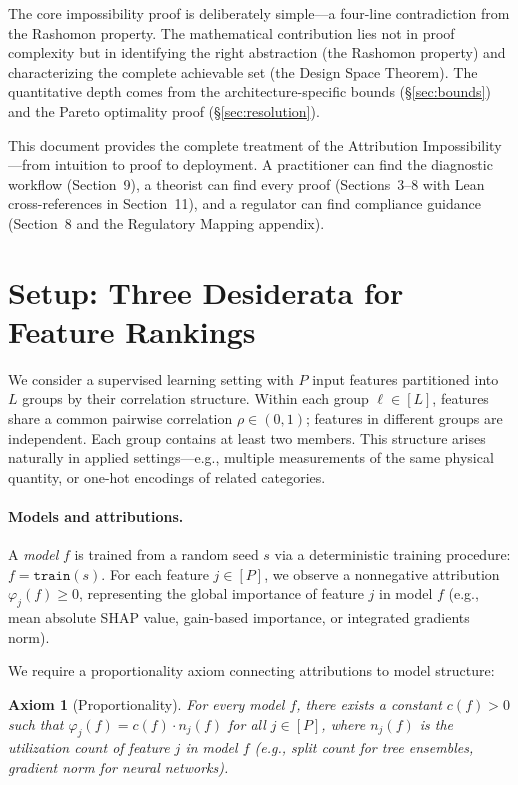 \documentclass{article}
\newtheorem{axiom}{Axiom}
\begin{document}
The core impossibility proof is deliberately simple---a four-line contradiction from the Rashomon property.
The mathematical contribution lies not in proof complexity but in identifying the right abstraction (the Rashomon property) and characterizing the complete achievable set (the Design Space Theorem).
The quantitative depth comes from the architecture-specific bounds (\S\ref{sec:bounds}) and the Pareto optimality proof (\S\ref{sec:resolution}).

This document provides the complete treatment of the Attribution Impossibility---from intuition to proof to deployment. A practitioner can find the diagnostic workflow (Section~9), a theorist can find every proof (Sections~3--8 with Lean cross-references in Section~11), and a regulator can find compliance guidance (Section~8 and the Regulatory Mapping appendix).


\section{Setup: Three Desiderata for Feature Rankings}
\label{sec:setup}

We consider a supervised learning setting with $P$ input features partitioned into $L$ groups by their correlation structure.
Within each group $\ell \in [L]$, features share a common pairwise correlation $\rho \in (0,1)$; features in different groups are independent.
Each group contains at least two members.
This structure arises naturally in applied settings---e.g., multiple measurements of the same physical quantity, or one-hot encodings of related categories.

\paragraph{Models and attributions.}
A \emph{model} $f$ is trained from a random seed $s$ via a deterministic training procedure: $f = \texttt{train}(s)$.
For each feature $j \in [P]$, we observe a nonneg\-ative attribution $\varphi_j(f) \geq 0$, representing the global importance of feature $j$ in model $f$ (e.g., mean absolute SHAP value, gain-based importance, or integrated gradients norm).

We require a proportionality axiom connecting attributions to model structure:

\begin{axiom}[Proportionality]
\label{ax:proportional}
For every model $f$, there exists a constant $c(f) > 0$ such that $\varphi_j(f) = c(f) \cdot n_j(f)$ for all $j \in [P]$, where $n_j(f)$ is the utilization count of feature $j$ in model $f$ (e.g., split count for tree ensembles, gradient norm for neural networks).
\end{axiom}
\end{document}
